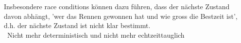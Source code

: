 \vspace{0.2cm}

Insbesondere race conditions können dazu führen, dass der nächste Zustand davon abhängt, 'wer das
Rennen gewonnen hat und wie gross die Bestzeit ist', d.h. der nächste Zustand ist nicht klar bestimmt.\\
\textrightarrow\ Nicht mehr deterministisch und nicht mehr echtzeittauglich










